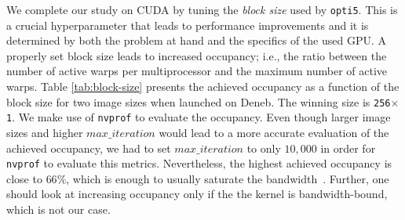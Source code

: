 \documentclass[11pt,a4paper]{article}
\begin{document}
We complete our study on CUDA by tuning the \textit{block size} used by \texttt{opti5}.
This is a crucial hyperparameter that leads to performance improvements and it is determined by both the problem at hand and the specifics of the used GPU.
A properly set block size leads to increased occupancy; i.e., the ratio between the number of active warps per multiprocessor and the maximum number of active warps.
Table \ref{tab:block-size} presents the achieved occupancy as a function of the block size for two image sizes when launched on Deneb.
The winning size is \texttt{256$\times$1}.
We make use of \texttt{nvprof} to evaluate the occupancy.
Even though larger image sizes and higher $max\_iteration$ would lead to a more accurate evaluation of the achieved occupancy, we had to set $max\_iteration$ to only $10,000$ in order for \texttt{nvprof} to evaluate this metrics.
Nevertheless, the highest achieved occupancy is close to $66\%$, which is enough to usually saturate the bandwidth~\cite{occupancy}.
Further, one should look at increasing occupancy only if the the kernel is bandwidth-bound, which is not our case.
\end{document}
